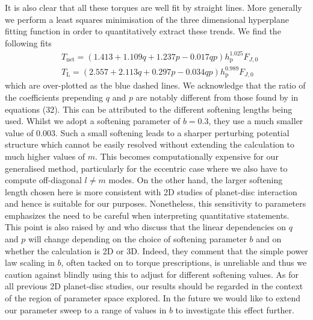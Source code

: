 It is also clear that all these torques are well fit by straight lines. More generally we perform a least squares minimisation of the three dimensional hyperplane fitting function in order to quantitatively extract these trends. We find the following fits 
%
\begin{align}
    & T_\textrm{net} = (1.413+1.109 q+1.237 p-0.017 q p)h_\textrm{p}^{1.025} F_{J,0} 
    \label{eq:Tnet_fit}\\
    & T_\textrm{L} = (2.557+2.113 q + 0.297 p -0.034 q p)h_\textrm{p}^{0.989} F_{J,0}
    \label{eq:TL_fit}
\end{align}
%
which are over-plotted as the blue dashed lines. We acknowledge that the ratio of the coefficients prepending $q$ and $p$ are notably different from those found by \cite{KorycanskyPollack_1993} in equations (32). This can be attributed to the different softening lengths being used. Whilst we adopt a softening parameter of $b = 0.3$, they use a much smaller value of $0.003$. Such a small softening leads to a sharper perturbing potential structure which cannot be easily resolved without extending the calculation to much higher values of $m$. This becomes computationally expensive for our generalised method, particularly for the eccentric case where we also have to compute off-diagonal $l \neq m$ modes. On the other hand, the larger softening length chosen here is more consistent with 2D studies of planet-disc interaction \citep[e.g.][]{CresswellNelson_2006, PaardekooperEtAl_2010} and hence is suitable for our purposes. Nonetheless, this sensitivity to parameters emphasizes the need to be careful when interpreting quantitative statements. This point is also raised by \cite{PaardekooperPapaloizou_2009} and \cite{PaardekooperEtAl_2010} who discuss that the linear dependencies on $q$ and $p$ will change depending on the choice of softening parameter $b$ and on whether the calculation is 2D or 3D. Indeed, they comment that the simple power law scaling in $b$, often tacked on to torque prescriptions, is unreliable and thus we caution against blindly using this to adjust for different softening values. As for all previous 2D planet-disc studies, our results should be regarded in the context of the region of parameter space explored. In the future we would like to extend our parameter sweep to a range of values in $b$ to investigate this effect further.